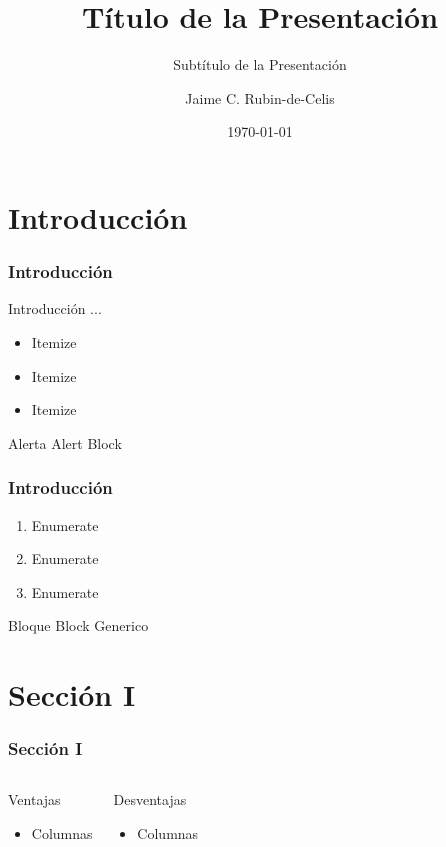 \documentclass[
	9pt,
]{beamer}
\title{Título de la Presentación}
\subtitle{Subtítulo de la Presentación}
\author{Jaime C. Rubin-de-Celis}
\institute{Universidad Técnica Federico Santa María}
\date{\today}
\numberwithin{equation}{section}
\begin{document}
\frame{\titlepage}

\section{Introducción}

%
\begin{frame}
\frametitle{Introducción}

Introducción ...

\begin{itemize}
\item Itemize
\item Itemize
\item Itemize
\end{itemize}

\begin{alertblock}{Alerta}
\centering
Alert Block
\end{alertblock}

\end{frame}


%
\begin{frame}
\frametitle{Introducción}
\begin{enumerate}
\item Enumerate
\item Enumerate
\item Enumerate
\end{enumerate}

\begin{block}{Bloque}
\centering
Block Generico
\end{block}

\end{frame}


\section{Sección I}

%
\begin{frame}
\frametitle{Sección I}
\begin{columns}[t]
	\begin{block}{Ventajas}
	\begin{itemize}
	\item Columnas
	\end{itemize}
	\end{block}
	\begin{block}{Desventajas}
	\begin{itemize}
	\item Columnas
	\end{itemize}
	\end{block}
\end{columns}
\end{frame}
\end{document}
